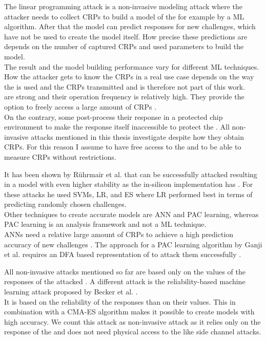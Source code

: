 The linear programming attack is a non-invasive modeling attack where the attacker needs to collect \acp{CRP} to build a model of the \puf for example by a \ac{ML} algorithm.
After that the model can predict responses for new challenges, which have not be used to create the model itself.
How precise these predictions are depends on the number of captured \acp{CRP} and used parameters to build the model.\\
The result and the model building performance vary for different \ac{ML} techniques.
How the attacker gets to know the \acp{CRP} in a real use case depends on the way the \puf is used and the \acp{CRP} transmitted and is therefore not part of this work.\\
\apufs are strong \pufs and their operation frequency is relatively high.
They provide the option to freely access a large amount of \acp{CRP} \cite{Ruhrmair2010ModelingFunctions}.\\
On the contrary, some \pufs post-process their response in a protected chip environment to make the \puf response itself inaccessible to protect the \puf \cite{Suh2007PhysicalGeneration, Gassend2004IdentificationCircuits}.
All non-invasive attacks mentioned in this thesis investigate \pufs despite how they obtain \acp{CRP}.
For this reason I assume to have free access to the \puf and to be able to measure \acp{CRP} without restrictions.

It has been shown by Rührmair et al. that \apufs can be successfully attacked resulting in a model with even higher stability as the \apuf in-silicon implementation has \cite{Ruhrmair2010ModelingFunctions}.
For these attacks he used \acp{SVM}, \ac{LR}, and \ac{ES} where \ac{LR} performed best in terms of predicting randomly chosen challenges.\\
Other techniques to create accurate \apuf models are \ac{ANN} and \ac{PAC} learning, whereas \ac{PAC} learning is an analysis framework and not a \ac{ML} technique.\\
\acp{ANN} need a relative large amount of \acp{CRP} to achieve a high prediction accuracy of new challenges \cite{Hospodar2012MachineUsability}.
The approach for a \ac{PAC} learning algorithm by Ganji et al. requires an \ac{DFA} based representation of \apufs to attack them successfully \cite{Ganji2016PACPUFs}.

All non-invasive attacks mentioned so far are based only on the values of the responses of the attacked \puf.
A different attack is the reliability-based machine learning attack proposed by Becker et al. \cite{Becker2015ThePUFs}.\\
It is based on the reliability of the \puf responses than on their values. 
This in combination with a \ac{CMA-ES} algorithm makes it possible to create \apuf models with high accuracy.
We count this attack as non-invasive attack as it relies only on the response of the \puf and does not need physical access to the \puf like side channel attacks.

